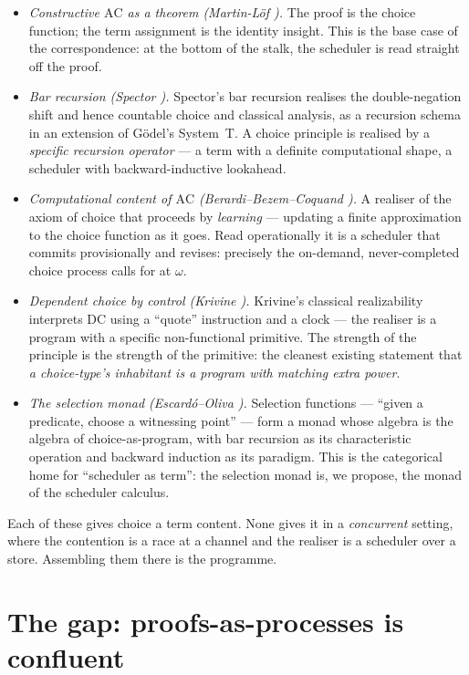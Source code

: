\documentclass[11pt]{article}
\theoremstyle{definition}
\theoremstyle{plain}
\theoremstyle{remark}
\newcommand{\AC}{\mathrm{AC}}
\newcommand{\DC}{\mathrm{DC}}
\begin{document}
\begin{itemize}[leftmargin=1.4em]
\item \emph{Constructive $\AC$ as a theorem (Martin-L\"of \cite{martinlof}).} The proof is the
choice function; the term assignment is the identity insight. This is the base case of the
correspondence: at the bottom of the stalk, the scheduler is read straight off the proof.
\item \emph{Bar recursion (Spector \cite{spector}).} Spector's bar recursion realises the
double-negation shift and hence countable choice and classical analysis, as a recursion schema in an
extension of G\"odel's System~T. A choice principle is realised by a \emph{specific recursion operator}
--- a term with a definite computational shape, a scheduler with backward-inductive lookahead.
\item \emph{Computational content of $\AC$ (Berardi--Bezem--Coquand \cite{bbc}).} A realiser of the
axiom of choice that proceeds by \emph{learning} --- updating a finite approximation to the choice
function as it goes. Read operationally it is a scheduler that commits provisionally and revises:
precisely the on-demand, never-completed choice process \cite{agency} calls for at $\omega$.
\item \emph{Dependent choice by control (Krivine \cite{krivine}).} Krivine's classical realizability
interprets $\DC$ using a ``quote'' instruction and a clock --- the realiser is a program with a
specific non-functional primitive. The strength of the principle is the strength of the primitive:
the cleanest existing statement that \emph{a choice-type's inhabitant is a program with matching
extra power}.
\item \emph{The selection monad (Escard\'o--Oliva \cite{escardo}).} Selection functions ---
``given a predicate, choose a witnessing point'' --- form a monad whose algebra is the algebra of
choice-as-program, with bar recursion as its characteristic operation and backward induction as its
paradigm. This is the categorical home for ``scheduler as term'': the selection monad is, we propose,
the monad of the scheduler calculus.
\end{itemize}

\noindent
Each of these gives choice a term content. None gives it in a \emph{concurrent} setting, where the
contention is a race at a channel and the realiser is a scheduler over a store. Assembling them there
is the programme.

\section{The gap: proofs-as-processes is confluent}\label{sec:gap}
\end{document}
